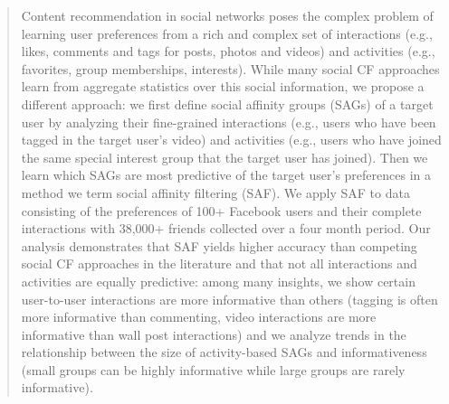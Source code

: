 \begin{quote}
Content recommendation in social networks poses the complex problem of
learning user preferences from a rich and complex set of interactions
(e.g., likes, comments and tags for posts, photos and videos) and
activities (e.g., favorites, group memberships, interests).  While
many social CF approaches learn from aggregate statistics over this
social information, we propose a different approach: we first define
social affinity groups (SAGs) of a target user by analyzing their
fine-grained interactions (e.g., users who have been tagged in the
target user's video) and activities (e.g., users who have joined the
same special interest group that the target user has joined).  Then we
learn which SAGs are most predictive of the target user's preferences
in a method we term social affinity filtering (SAF).  We apply SAF to
data consisting of the preferences of 100+ Facebook users and their
complete interactions with 38,000+ friends collected over a four month
period.  Our analysis demonstrates that SAF yields higher accuracy
than competing social CF approaches in the literature and that not all
interactions and activities are equally predictive: among many
insights, we show certain user-to-user interactions are more
informative than others (tagging is often more informative than
commenting, video interactions are more informative than wall post
interactions) and we analyze trends in the relationship between the
size of activity-based SAGs and informativeness (small groups can be
highly informative while large groups are rarely informative).
\end{quote}
